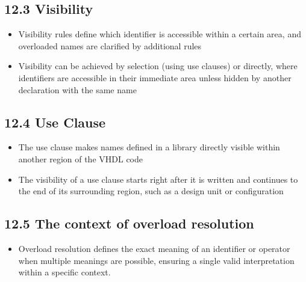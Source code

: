 \documentclass[a4paper,12pt]{article}
\begin{document}
	\subsection*{12.3 Visibility}
	\begin{itemize}
		\item Visibility rules define which identifier is accessible within a certain area, and overloaded names are clarified by additional rules
		\item Visibility can be achieved by selection (using use clauses) or directly, where identifiers are accessible in their immediate area unless hidden by another declaration with the same name
	\end{itemize}
	
	\subsection*{12.4 Use Clause}
	\begin{itemize}
		\item The use clause makes names defined in a library directly visible within another region of the VHDL code
		\item The visibility of a use clause starts right after it is written and continues to the end of its surrounding region, such as a design unit or configuration
	\end{itemize}
	
	\subsection*{12.5 The context of overload resolution}
	\begin{itemize}
		\item Overload resolution defines the exact meaning of an identifier or operator when multiple meanings are possible, ensuring a single valid interpretation within a specific context.
	\end{itemize}
	
	
	
	
\end{document}
